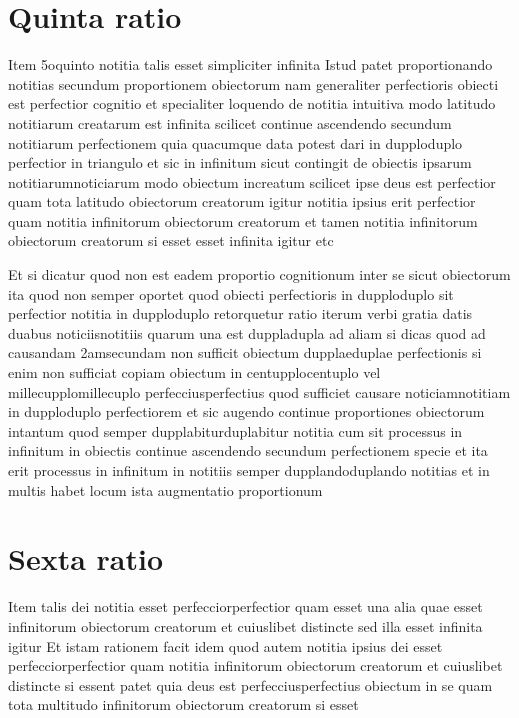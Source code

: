 \documentclass[twoside, openright]{report}
\begin{document}
         \section*{Quinta ratio} 
        \pstart
        Item 5oquinto notitia talis esset simpliciter infinita Istud patet proportionando notitias secundum proportionem obiectorum nam generaliter perfectioris obiecti est perfectior cognitio et specialiter loquendo de notitia intuitiva modo latitudo notitiarum creatarum est infinita scilicet continue ascendendo secundum notitiarum perfectionem quia quacumque data potest dari in dupploduplo perfectior in triangulo et sic in infinitum sicut contingit de obiectis ipsarum notitiarumnoticiarum modo obiectum increatum scilicet ipse deus est perfectior quam tota latitudo obiectorum creatorum igitur notitia ipsius erit perfectior quam notitia infinitorum obiectorum creatorum et tamen notitia infinitorum obiectorum creatorum si esset esset infinita igitur etc
        \pend
     
        \pstart
        Et si dicatur quod non est eadem proportio cognitionum inter se sicut obiectorum ita quod non semper oportet quod obiecti perfectioris in dupploduplo sit perfectior notitia in dupploduplo retorquetur ratio iterum verbi gratia  datis duabus noticiisnotitiis quarum una est duppladupla ad aliam si dicas quod ad causandam 2amsecundam non sufficit obiectum dupplaeduplae perfectionis si enim non sufficiat copiam obiectum in centupplocentuplo vel millecupplomillecuplo perfecciusperfectius quod sufficiet causare noticiamnotitiam in dupploduplo perfectiorem et sic augendo continue proportiones obiectorum intantum quod semper dupplabiturduplabitur notitia cum sit processus in infinitum in obiectis continue ascendendo secundum perfectionem specie et ita erit processus in infinitum in notitiis semper dupplandoduplando notitias et in multis habet locum ista augmentatio proportionum
        \pend
      
        \bigskip
         \section*{Sexta ratio} 
        \pstart
        Item talis dei notitia esset perfecciorperfectior quam esset una alia quae esset infinitorum obiectorum creatorum et cuiuslibet distincte sed illa esset infinita igitur Et istam rationem facit idem quod autem notitia ipsius dei esset perfecciorperfectior quam notitia infinitorum obiectorum creatorum et cuiuslibet distincte si essent patet quia deus est perfecciusperfectius obiectum in se quam tota multitudo infinitorum obiectorum creatorum si esset
        \pend
      
\end{document}
